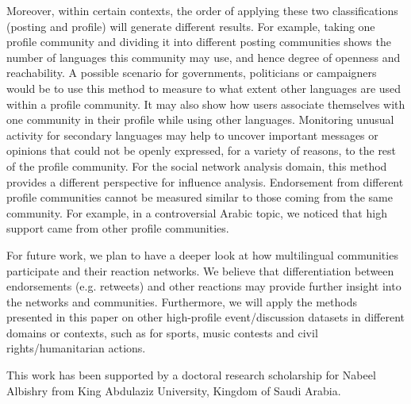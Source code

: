 Moreover, within certain contexts, the order of applying these two
classifications (posting and profile) will generate different results.
For example, taking one profile community and dividing it into
different posting communities shows the number of languages this
community may use, and hence degree of openness and reachability. A
possible scenario for governments, politicians or campaigners would be
to use this method to measure to what extent other languages are used
within a profile community. It may also show how users associate
themselves with one community in their profile while using other
languages. Monitoring unusual activity for secondary languages may
help to uncover important messages or opinions that could not be
openly expressed, for a variety of reasons, to the rest of the profile
community. For the social network analysis domain, this method
provides a different perspective for influence analysis. Endorsement
from different profile communities cannot be measured similar to those
coming from the same community. For example, in a controversial Arabic
topic, we noticed that high support came from other profile
communities.

For future work, we plan to have a deeper look at how multilingual
communities participate and their reaction networks. We believe that
differentiation between endorsements (e.g. retweets) and other
reactions may provide further insight into the networks and
communities. Furthermore, we will apply the methods presented in this
paper on other high-profile event/discussion datasets in different
domains or contexts, such as for sports, music contests and civil
rights/humanitarian actions.





\begin{acks}
This work has been supported by a doctoral research scholarship for
Nabeel Albishry from King Abdulaziz University, Kingdom of Saudi
Arabia.
\end{acks}
